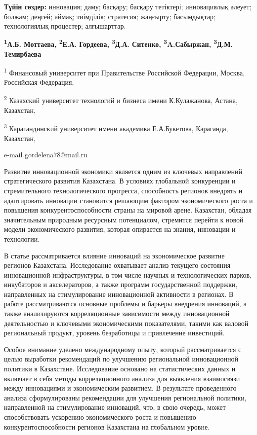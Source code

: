{\bfseries Түйін сөздер:} инновация; даму; басқару; басқару тетіктері;
инновациялық әлеует; болжам; деңгей; аймақ; тиімділік; стратегия;
жаңғырту; басымдықтар; технологиялық процестер; алғышарттар.


\begin{center}
{\bfseries \textsuperscript{1}А.Б. Моттаева, \textsuperscript{2}Е.А.
Гордеева\envelope, \textsuperscript{3}Д.А. Ситенко,
\textsuperscript{3}A.Сабыржан, \textsuperscript{3}Д.М.}
{\bfseries Темирбаева}

\textsuperscript{1} Финансовый университет при Правительстве Российской
Федерации, Москва, Российская Федерация,

\textsuperscript{2} Казахский университет технологий и бизнеса имени
К.Кулажанова, Астана, Казахстан,

\textsuperscript{3} Карагандинский университет имени академика
Е.А.Букетова, Караганда, Казахстан,

e-mail gordelena78@mail.ru
\end{center}

Развитие инновационной экономики является одним из ключевых направлений
стратегического развития Казахстана. В условиях глобальной конкуренции и
стремительного технологического прогресса, способность регионов внедрять
и адаптировать инновации становится решающим фактором экономического
роста и повышения конкурентоспособности страны на мировой арене.
Казахстан, обладая значительным природным ресурсным потенциалом,
стремится перейти к новой модели экономического развития, которая
опирается на знания, инновации и технологии.

В статье рассматривается влияние инноваций на экономическое развитие
регионов Казахстана. Исследование охватывает анализ текущего состояния
инновационной инфраструктуры, в том числе научных и технологических
парков, инкубаторов и акселераторов, а также программ государственной
поддержки, направленных на стимулирование инновационной активности в
регионах. В работе рассматриваются основные проблемы и барьеры внедрения
инноваций, а также анализируются корреляционные зависимости между
инновационной деятельностью и ключевыми экономическими показателями,
такими как валовой региональный продукт, уровень безработицы и
привлечение инвестиций.

Особое внимание уделено международному опыту, который рассматривается с
целью выработки рекомендаций по улучшению региональной инновационной
политики в Казахстане. Исследование основано на статистических данных и
включает в себя методы корреляционного анализа для выявления взаимосвязи
между инновациями и экономическим развитием. В результате проведенного
анализа сформулированы рекомендации для улучшения региональной политики,
направленной на стимулирование инноваций, что, в свою очередь, может
способствовать ускорению экономического роста и повышению
конкурентоспособности регионов Казахстана на глобальном уровне.

